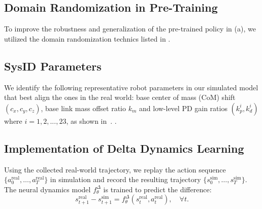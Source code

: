 % 

\subsection{Domain Randomization in Pre-Training}
\label{sec:dr-pre-train}
To improve the robustness and generalization of the pre-trained policy in  (a), we utilized the domain randomization technics listed in .


% 

\subsection{SysID Parameters}
We identify the following representative robot parameters in our simulated model that best align the ones in the real world: base center of mass (CoM) shift $(c_x, c_y, c_z)$, base link mass offset ratio $k_m$ and low-level PD gain ratios $(k^i_p, k^i_d)$ where $i=1,2,...,23$, as shown in~.
.


\subsection{Implementation of Delta Dynamics Learning}
\label{sec:appendix-dynamics}
Using the collected real-world trajectory, we replay the action sequence $\{a^\text{real}_0, \dots, a^\text{real}_T\}$ in simulation and record the resulting trajectory $\{s^\text{sim}_0, \dots, s^\text{sim}_T\}$. The neural dynamics model $f^\Delta_\theta$ is trained to predict the difference: 
\[
s^\text{real}_{t+1} - s^\text{sim}_{t+1} = f^\Delta_\theta(s^\text{real}_t, a^\text{real}_t), \quad \forall t.
\]

